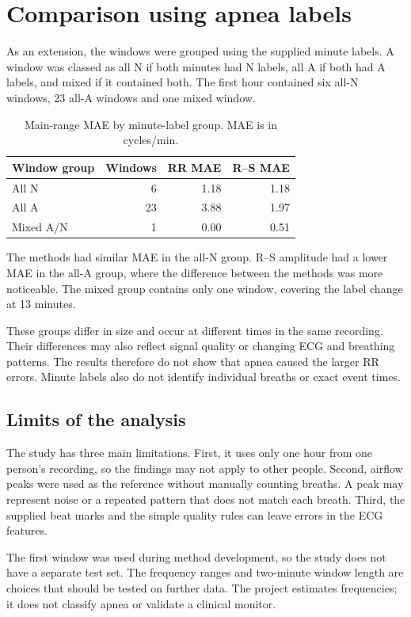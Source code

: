 \chapter{Comparison using apnea labels}\label{ch:8}

As an extension, the windows were grouped using the supplied minute labels. A window was classed as all N if both minutes had N labels, all A if both had A labels, and mixed if it contained both. The first hour contained six all-N windows, 23 all-A windows and one mixed window.

\begin{table}[H]
\centering
\caption{Main-range MAE by minute-label group. MAE is in cycles/min.}
\small
\begin{tabular}{lrrr}
\toprule
\textbf{Window group} & \textbf{Windows} & \textbf{RR MAE} & \textbf{R--S MAE} \\
\midrule
All N & 6 & 1.18 & 1.18 \\
All A & 23 & 3.88 & 1.97 \\
Mixed A/N & 1 & 0.00 & 0.51 \\
\bottomrule
\end{tabular}
\end{table}

The methods had similar MAE in the all-N group. R--S amplitude had a lower MAE in the all-A group, where the difference between the methods was more noticeable. The mixed group contains only one window, covering the label change at 13 minutes.

These groups differ in size and occur at different times in the same recording. Their differences may also reflect signal quality or changing ECG and breathing patterns. The results therefore do not show that apnea caused the larger RR errors. Minute labels also do not identify individual breaths or exact event times.

\section{Limits of the analysis}

The study has three main limitations. First, it uses only one hour from one person's recording, so the findings may not apply to other people. Second, airflow peaks were used as the reference without manually counting breaths. A peak may represent noise or a repeated pattern that does not match each breath. Third, the supplied beat marks and the simple quality rules can leave errors in the ECG features.

The first window was used during method development, so the study does not have a separate test set. The frequency ranges and two-minute window length are choices that should be tested on further data. The project estimates frequencies; it does not classify apnea or validate a clinical monitor.

